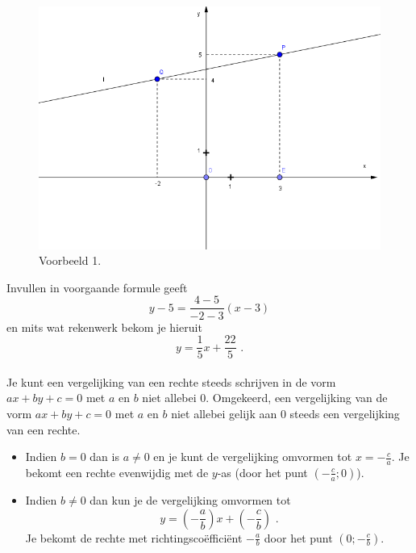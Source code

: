 \begin{figure}[!htb]
\begin{center}
\includegraphics[height=5 cm]{4_opp_inhoud_an_meetk/inputs/AMTekst4Fig5}
\caption{Voorbeeld 1.}
\label{fig4.2.9_fig5}
\end{center}
\end{figure}

Invullen in voorgaande formule geeft
\[
y-5=\frac{4-5}{-2-3}(x-3)
\]
en mits wat rekenwerk bekom je hieruit
\[
y=\frac{1}{5}x+\frac{22}{5} \text { .}
\]\\

Je kunt een vergelijking van een rechte steeds schrijven in de vorm $ax+by+c=0$ met $a$ en $b$ niet allebei 0.
Omgekeerd, een vergelijking van de vorm $ax+by+c=0$ met $a$ en $b$ niet allebei gelijk aan 0 steeds een vergelijking van een rechte.
\begin{itemize}
\item Indien $b=0$ dan is $a \neq 0$ en je kunt de vergelijking omvormen tot $x=-\frac{c}{a}$.
Je bekomt een rechte evenwijdig met de $y$-as (door het punt $(-\frac{c}{a};0)$).
\item Indien $b \neq 0$ dan kun je de vergelijking omvormen tot
\[
y=\left( -\frac{a}{b}  \right)x+\left(  -\frac{c}{b} \right) \text { .}
\]
Je bekomt de rechte met richtingsco\"effici\"ent $-\frac {a}{b}$ door het punt $(0; -\frac{c}{b})$.
\end{itemize}

